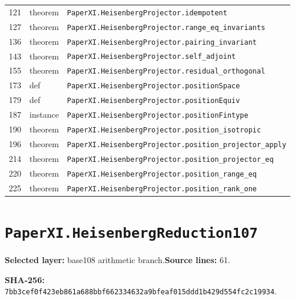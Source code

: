\documentclass[10pt,oneside]{book}
\begin{document}
\begin{longtable}{@{}p{}p{}p{}@{}}
121&theorem&\nolinkurl{PaperXI.HeisenbergProjector.idempotent}\\

127&theorem&\nolinkurl{PaperXI.HeisenbergProjector.range_eq_invariants}\\

136&theorem&\nolinkurl{PaperXI.HeisenbergProjector.pairing_invariant}\\

143&theorem&\nolinkurl{PaperXI.HeisenbergProjector.self_adjoint}\\

155&theorem&\nolinkurl{PaperXI.HeisenbergProjector.residual_orthogonal}\\

173&def&\nolinkurl{PaperXI.HeisenbergProjector.positionSpace}\\

179&def&\nolinkurl{PaperXI.HeisenbergProjector.positionEquiv}\\

187&instance&\nolinkurl{PaperXI.HeisenbergProjector.positionFintype}\\

190&theorem&\nolinkurl{PaperXI.HeisenbergProjector.position_isotropic}\\

196&theorem&\nolinkurl{PaperXI.HeisenbergProjector.position_projector_apply}\\

214&theorem&\nolinkurl{PaperXI.HeisenbergProjector.position_projector_eq}\\

220&theorem&\nolinkurl{PaperXI.HeisenbergProjector.position_range_eq}\\

225&theorem&\nolinkurl{PaperXI.HeisenbergProjector.position_rank_one}\\

\bottomrule\end{longtable}

\section{\texorpdfstring{\nolinkurl{PaperXI.HeisenbergReduction107}}{PaperXI.HeisenbergReduction107}}\label{module:PaperXI.HeisenbergReduction107}

\textbf{Selected layer:} base108 arithmetic branch.\quad\textbf{Source lines:} 61.\par\textbf{SHA-256:} {\scriptsize\nolinkurl{7bb3cef0f423eb861a688bbf662334632a9bfeaf015ddd1b429d554fc2c19934}}.
\end{document}
